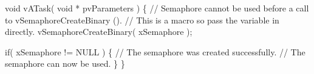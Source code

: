 \begin{DoxyPre}void vATask( void * pvParameters )
\{
   // Semaphore cannot be used before a call to vSemaphoreCreateBinary ().
   // This is a macro so pass the variable in directly.
   vSemaphoreCreateBinary( xSemaphore );\end{DoxyPre}



\begin{DoxyPre}   if( xSemaphore != NULL )
   \{
       // The semaphore was created successfully.
       // The semaphore can now be used.
   \}
\}
\end{DoxyPre}
 
